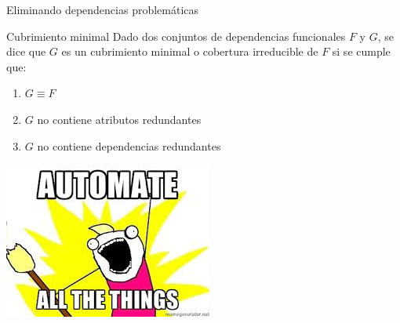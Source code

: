 \begin{frame}{Eliminando dependencias problem\'aticas}
    \begin{block}{Cubrimiento minimal}
        Dado dos conjuntos de dependencias funcionales $F$ y $G$, se dice
        que $G$ es un cubrimiento minimal o cobertura irreducible
        de $F$ si se cumple que:
        \begin{enumerate}
            \item $G \equiv F$
            \item $G$ no contiene atributos redundantes
            \item $G$ no contiene dependencias redundantes
        \end{enumerate}
        
    \end{block}
\end{frame}


{
{
    \includegraphics[width=\paperwidth,height=\paperheight]{img/automate.jpg}
}
\begin{frame}
\end{frame}
}


